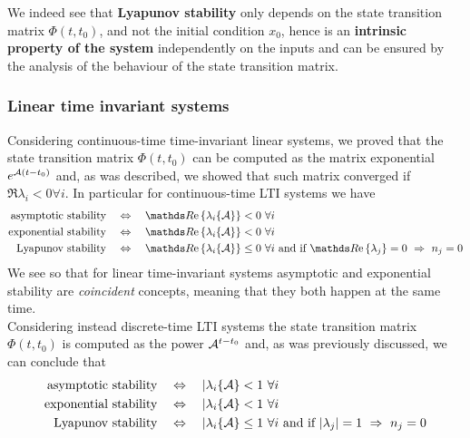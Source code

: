 	We indeed see that \textbf{Lyapunov stability} only depends on the state transition matrix $\Phi(t,t_0)$, and not the initial condition $x_0$, hence is an \textbf{intrinsic property of the system} independently on the inputs and can be ensured by the analysis of the behaviour of the state transition matrix.
	
	\subsubsection{Linear time invariant systems}
		Considering continuous-time time-invariant linear systems, we proved that the state transition matrix $\Phi(t,t_0)$ can be computed as the matrix exponential $e^{\mathcal{A}(t-t_0)}$ and, as was described, we showed that such matrix converged if $\Re{\lambda_i} < 0 \forall i$. In particular for continuous-time LTI systems we have 
		\begin{align*}
			\textrm{asymptotic stability} \quad & \Leftrightarrow \quad \Re{ \lambda_i\{\A\} } < 0 \ \forall i \\
			\textrm{exponential stability} \quad & \Leftrightarrow \quad \Re{ \lambda_i\{\A\} } < 0 \ \forall i \\
			\textrm{Lyapunov stability} \quad & \Leftrightarrow \quad \Re{ \lambda_i\{\A\} } \leq 0 \ \forall i \textrm{ and if } \Re{\lambda_j} = 0 \ \Rightarrow \ n_j = 0
		\end{align*} 
		We see so that for linear time-invariant systems asymptotic and exponential stability are \textit{coincident} concepts, meaning that they both happen at the same time.\\
		Considering instead discrete-time LTI systems the state transition matrix $\Phi(t,t_0)$ is computed as the power $\mathcal{A}^{t-t_0}$ and, as was previously discussed, we can conclude that
		\begin{align*}
			\textrm{asymptotic stability} \quad & \Leftrightarrow \quad |\lambda_i\{\mathcal{A}\} < 1 \ \forall i \\
			\textrm{exponential stability} \quad & \Leftrightarrow \quad |\lambda_i\{\mathcal{A}\} < 1 \ \forall i \\
			\textrm{Lyapunov stability} \quad & \Leftrightarrow \quad |\lambda_i\{\mathcal{A}\} \leq 1 \ \forall i \textrm{ and if } |\lambda_j| = 1 \ \Rightarrow \ n_j = 0
		\end{align*} 
	
	
	
	
	
	
	
	
	
	
	
	
	
	
	
		
